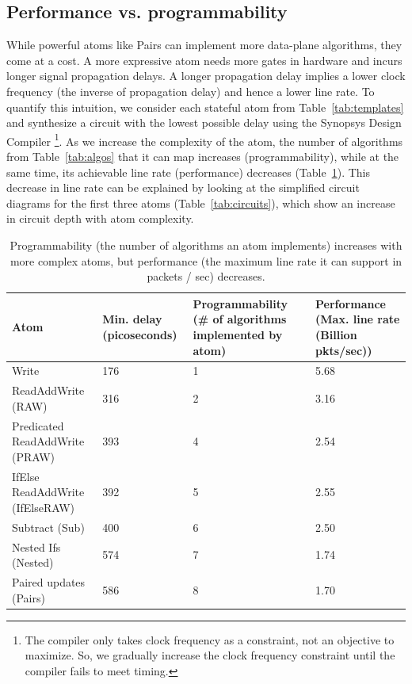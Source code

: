 \subsection{Performance vs. programmability}
\label{ss:perfprog}

While powerful atoms like Pairs can implement more data-plane algorithms, they
come at a cost.  A more expressive atom needs more gates in hardware and incurs
longer signal propagation delays. A longer propagation delay implies a lower
clock frequency (the inverse of propagation delay) and hence a lower line rate.
To quantify this intuition, we consider each stateful atom from
Table~\ref{tab:templates} and synthesize a circuit with the lowest possible
delay using the Synopsys Design Compiler \footnote{The compiler only takes
clock frequency as a constraint, not an objective to maximize. So, we gradually
increase the clock frequency constraint until the compiler fails to meet
timing.}. As we increase the complexity of the atom, the number of algorithms
from Table~\ref{tab:algos} that it can map increases (programmability), while
at the same time, its achievable line rate (performance) decreases
(Table~\ref{tab:perfprog}). This decrease in line rate can be explained by
looking at the simplified circuit diagrams for the first three atoms
(Table~\ref{tab:circuits}), which show an increase in circuit depth with atom
complexity.

\begin{table}[!t]
  \begin{scriptsize}
  \begin{tabular}{|p{}|p{}|p{}|p{}|}
  \hline
  Atom & Min. delay (picoseconds) & Programmability (\# of algorithms implemented by atom) & Performance (Max. line rate (Billion pkts/sec)) \\
  \hline
  Write & 176 & 1  & 5.68 \\
  \hline
  ReadAddWrite (RAW) & 316 & 2 & 3.16\\
  \hline
  \pbox{0.1\textwidth}
  {Predicated\\
  ReadAddWrite (PRAW)} & 393 & 4 & 2.54 \\
  \hline
  IfElse ReadAddWrite (IfElseRAW) & 392 & 5 & 2.55 \\
  \hline
  Subtract (Sub) & 400 & 6 & 2.50 \\
  \hline
  Nested Ifs (Nested) & 574 & 7 & 1.74 \\
  \hline
  Paired updates (Pairs) & 586 & 8 & 1.70 \\
  \hline
  \end{tabular}
\end{scriptsize}
\caption{Programmability (the number of algorithms an atom implements)
  increases with more complex atoms, but performance (the maximum line
  rate it can support in packets / sec) decreases.}
  \label{tab:perfprog}
\end{table}


